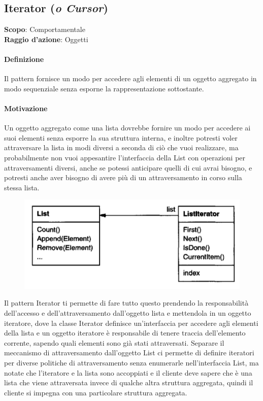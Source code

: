 \subsection{Iterator (\textit{o Cursor})}
\label{iterator}

\textbf{Scopo}: Comportamentale \\
\textbf{Raggio d'azione}: Oggetti

\paragraph{Definizione} Il pattern fornisce un modo per accedere agli elementi di un oggetto aggregato in modo sequenziale senza esporne la rappresentazione sottostante.

\paragraph{Motivazione} Un oggetto aggregato come una lista dovrebbe fornire un modo per accedere ai suoi elementi senza esporre la sua struttura interna, e inoltre potresti voler attraversare la lista in modi diversi a seconda di ciò che vuoi realizzare, ma probabilmente non vuoi appesantire l'interfaccia della List con operazioni per attraversamenti diversi, anche se potessi anticipare quelli di cui avrai bisogno, e potresti anche aver bisogno di avere più di un attraversamento in corso sulla stessa lista.

\begin{figure}[H]
    \centering
    \includegraphics[width=0.5\linewidth]{assets/pattern/iterator/iterator-esempio-1.png}
\end{figure}

Il pattern Iterator ti permette di fare tutto questo prendendo la responsabilità dell'accesso e dell'attraversamento dall'oggetto lista e mettendola in un oggetto iteratore, dove la classe Iterator definisce un'interfaccia per accedere agli elementi della lista e un oggetto iteratore è responsabile di tenere traccia dell'elemento corrente, sapendo quali elementi sono già stati attraversati. Separare il meccanismo di attraversamento dall'oggetto List ci permette di definire iteratori per diverse politiche di attraversamento senza enumerarle nell'interfaccia List, ma notate che l'iteratore e la lista sono accoppiati e il cliente deve sapere che è una lista che viene attraversata invece di qualche altra struttura aggregata, quindi il cliente si impegna con una particolare struttura aggregata.

